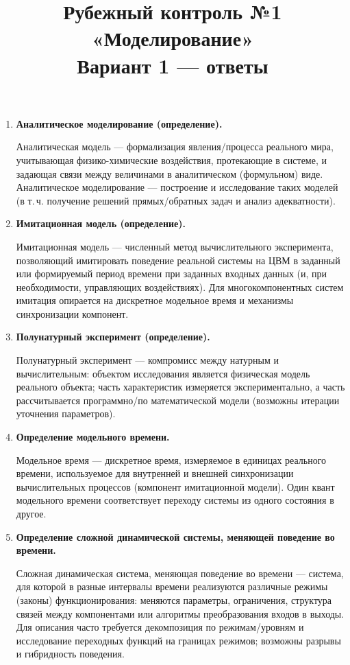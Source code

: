 \documentclass[12pt,a4paper]{article}
\title{Рубежный контроль №1 «Моделирование»\\Вариант 1 — ответы}
\author{}
\date{}
\begin{document}
\maketitle

\begin{enumerate}[label=\textbf{\arabic*.}]

\item \textbf{Аналитическое моделирование (определение).}

Аналитическая модель — формализация явления/процесса реального мира, учитывающая физико-химические воздействия, протекающие в системе, и задающая связи между величинами в аналитическом (формульном) виде. Аналитическое моделирование — построение и исследование таких моделей (в т.\,ч. получение решений прямых/обратных задач и анализ адекватности).

\item \textbf{Имитационная модель (определение).}

Имитационная модель — численный метод вычислительного эксперимента, позволяющий имитировать поведение реальной системы на ЦВМ в заданный или формируемый период времени при заданных входных данных (и, при необходимости, управляющих воздействиях). Для многокомпонентных систем имитация опирается на дискретное модельное время и механизмы синхронизации компонент.

\item \textbf{Полунатурный эксперимент (определение).}

Полунатурный эксперимент — компромисс между натурным и вычислительным: объектом исследования является физическая модель реального объекта; часть характеристик измеряется экспериментально, а часть рассчитывается программно/по математической модели (возможны итерации уточнения параметров).

\item \textbf{Определение модельного времени.}

Модельное время — дискретное время, измеряемое в единицах реального времени, используемое для внутренней и внешней синхронизации вычислительных процессов (компонент имитационной модели). Один квант модельного времени соответствует переходу системы из одного состояния в другое.

\item \textbf{Определение сложной динамической системы, меняющей поведение во времени.}

Сложная динамическая система, меняющая поведение во времени — система, для которой в разные интервалы времени реализуются различные режимы (законы) функционирования: меняются параметры, ограничения, структура связей между компонентами или алгоритмы преобразования входов в выходы. Для описания часто требуется декомпозиция по режимам/уровням и исследование переходных функций на границах режимов; возможны разрывы и гибридность поведения.


\end{enumerate}
\end{document}
